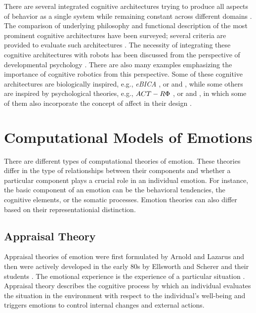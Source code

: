 \documentclass[12pt]{report}
\begin{document}
There are several integrated cognitive architectures trying to produce all
aspects of behavior as a single system while remaining constant across different
domains \cite{anderson:act-r, laird:soar}. The comparison of underlying
philosophy and functional description of the most prominent cognitive
architectures have been surveyed; several criteria are provided to evaluate such
architectures
\cite{chong:cognitive-architectures-survey,langley:cognitive-architectures,
thorisson:cognitive-architectures-autonomy}. The necessity of integrating these
cognitive architectures with robots has been discussed from the perspective of
developmental psychology \cite{asada:cognitive-robotics-humanoid,
d'mello:computational-functional-modeling,
kelley:cognitive-robotics-psychology}. There are also many examples emphasizing
the importance of cognitive robotics from this perspective. Some of these
cognitive architectures are biologically inspired, e.g., \textit{eBICA}
\cite{samsonovich:emotional-biologically-architecture}, or
\cite{baxter:cognitive-architecture-hri} and
\cite{ray:self-sustaining-architecture}, while some others are inspired by
psychological theories, e.g., $\MakeUppercase{ACT-R\Phi}$
\cite{dancy:actR-physiology-affect}, or
\cite{mirolli:vygotskyan-cognitive-robotics} and
\cite{dominey:shared-intention-cognition}, in which some of them also
incorporate the concept of affect in their design
\cite{cai:affective-model-psi}.

\section{Computational Models of Emotions}
There are different types of computational theories of emotion. These theories
differ in the type of relationships between their components and whether a
particular component plays a crucial role in an individual emotion. For
instance, the basic component of an emotion can be the behavioral tendencies,
the cognitive elements, or the somatic processes. Emotion theories can also
differ based on their representationial distinction.

\subsection{Appraisal Theory}
\label{sec:appraisal-theory}

Appraisal theories of emotion were first formulated by Arnold
\cite{arnold:emotion-personality} and Lazarus \cite{lazarus:emotion-adaptation}
and then were actively developed in the early 80s by Ellsworth and Scherer and
their students \cite{roseman:appraisal-theory}
\cite{sander:systems-approach-appraisal} \cite{scherer:nature-function-emotion}
\cite{scherer:emotions-emergent} \cite{scherer:appraisal-processes}. The
emotional experience is the experience of a particular situation
\cite{frijda:emotions}. Appraisal theory describes the cognitive process by
which an individual evaluates the situation in the environment with respect to
the individual's well-being and triggers emotions to control internal changes
and external actions.
\end{document}

